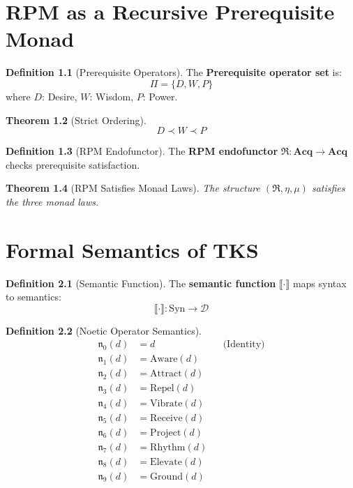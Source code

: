 \documentclass[11pt,twoside,openright]{book}
\theoremstyle{definition}
\newtheorem{definition}{Definition}[chapter]
\theoremstyle{plain}
\newtheorem{theorem}[definition]{Theorem}
\theoremstyle{remark}
\newcommand{\sem}[1]{\llbracket #1 \rrbracket}
\newcommand{\Acq}{\mathbf{Acq}}
\newcommand{\RPM}{\mathfrak{R}}
\begin{document}
\chapter{RPM as a Recursive Prerequisite Monad}
\label{ch:rpm-monad}

\begin{definition}[Prerequisite Operators]
\label{def:prereq-ops}
The \textbf{Prerequisite operator set} is:
\[
\Pi = \{D, W, P\}
\]
where $D$: Desire, $W$: Wisdom, $P$: Power.
\end{definition}

\begin{theorem}[Strict Ordering]
\label{thm:prereq-order}
\[
D \prec W \prec P
\]
\end{theorem}

\begin{definition}[RPM Endofunctor]
\label{def:rpm-endofunctor}
The \textbf{RPM endofunctor} $\RPM : \Acq \to \Acq$ checks prerequisite satisfaction.
\end{definition}

\begin{theorem}[RPM Satisfies Monad Laws]
\label{thm:rpm-monad-laws}
The structure $(\RPM, \eta, \mu)$ satisfies the three monad laws.
\end{theorem}

\chapter{Formal Semantics of TKS}
\label{ch:denotational-semantics}

\begin{definition}[Semantic Function]
\label{def:sem-function}
The \textbf{semantic function} $\sem{\cdot}$ maps syntax to semantics:
\[
\sem{\cdot} : \mathrm{Syn} \to \mathcal{D}
\]
\end{definition}

\begin{definition}[Noetic Operator Semantics]
\label{def:noetic-sem}
\begin{align}
\mathfrak{n}_0(d) &= d && \text{(Identity)} \\
\mathfrak{n}_1(d) &= \mathrm{Aware}(d) \\
\mathfrak{n}_2(d) &= \mathrm{Attract}(d) \\
\mathfrak{n}_3(d) &= \mathrm{Repel}(d) \\
\mathfrak{n}_4(d) &= \mathrm{Vibrate}(d) \\
\mathfrak{n}_5(d) &= \mathrm{Receive}(d) \\
\mathfrak{n}_6(d) &= \mathrm{Project}(d) \\
\mathfrak{n}_7(d) &= \mathrm{Rhythm}(d) \\
\mathfrak{n}_8(d) &= \mathrm{Elevate}(d) \\
\mathfrak{n}_9(d) &= \mathrm{Ground}(d)
\end{align}
\end{definition}
\end{document}
